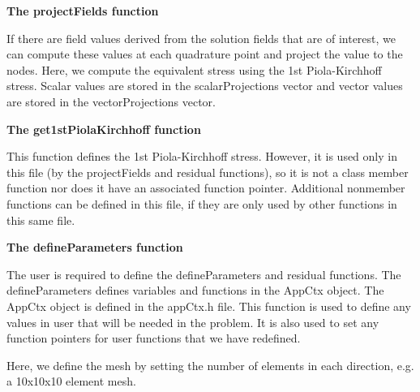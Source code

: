 \begin{DoxyCodeInclude}

\end{DoxyCodeInclude}


{\bfseries  The {\ttfamily project\-Fields} function }

If there are field values derived from the solution fields that are of interest, we can compute these values at each quadrature point and project the value to the nodes. Here, we compute the equivalent stress using the 1st Piola-\/\-Kirchhoff stress. Scalar values are stored in the {\ttfamily scalar\-Projections} vector and vector values are stored in the {\ttfamily vector\-Projections} vector.


\begin{DoxyCodeInclude}

\end{DoxyCodeInclude}


{\bfseries  The {\ttfamily get1st\-Piola\-Kirchhoff} function }

This function defines the 1st Piola-\/\-Kirchhoff stress. However, it is used only in this file (by the {\ttfamily project\-Fields} and {\ttfamily residual} functions), so it is not a class member function nor does it have an associated function pointer. Additional nonmember functions can be defined in this file, if they are only used by other functions in this same file.


\begin{DoxyCodeInclude}

\end{DoxyCodeInclude}


{\bfseries  The {\ttfamily define\-Parameters} function }

The user is required to define the {\ttfamily define\-Parameters} and {\ttfamily residual} functions. The {\ttfamily define\-Parameters} defines variables and functions in the {\ttfamily App\-Ctx} object. The {\ttfamily App\-Ctx} object is defined in the app\-Ctx.\-h file. This function is used to define any values in {\ttfamily user} that will be needed in the problem. It is also used to set any function pointers for user functions that we have redefined.


\begin{DoxyCodeInclude}

\end{DoxyCodeInclude}


Here, we define the mesh by setting the number of elements in each direction, e.\-g. a 10x10x10 element mesh.


